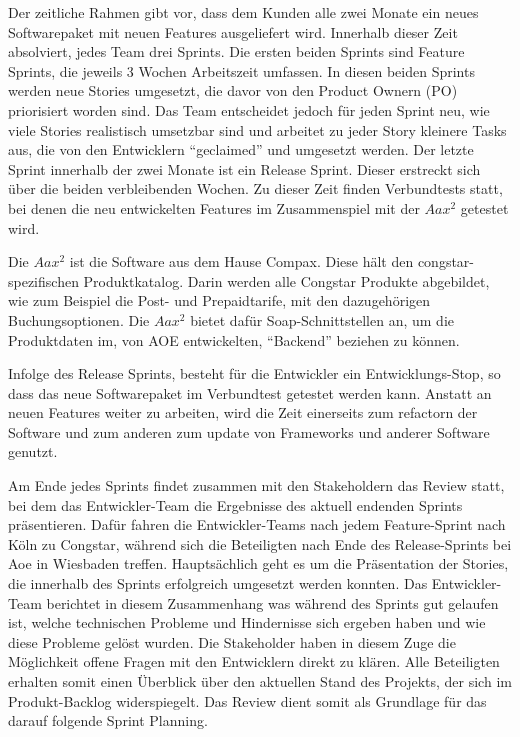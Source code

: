 \documentclass[11pt,a4paper]{article} %
\begin{document}
Der zeitliche Rahmen gibt vor, dass dem Kunden alle zwei Monate ein neues Softwarepaket mit neuen Features ausgeliefert wird. 
Innerhalb dieser Zeit absolviert, jedes Team drei Sprints. Die ersten beiden Sprints sind Feature Sprints, 
die jeweils 3 Wochen Arbeitszeit umfassen. In diesen beiden Sprints werden neue Stories umgesetzt, 
die davor von den Product Ownern (PO) priorisiert worden sind. Das Team entscheidet jedoch für jeden Sprint neu, 
wie viele Stories realistisch umsetzbar sind und arbeitet zu jeder Story kleinere Tasks aus, 
die von den Entwicklern “geclaimed” und umgesetzt werden. Der letzte Sprint innerhalb der zwei Monate ist ein Release Sprint. 
Dieser erstreckt sich über die beiden verbleibenden Wochen. 
Zu dieser Zeit finden Verbundtests statt, bei denen die neu entwickelten Features im Zusammenspiel mit der $Aax^{2}$ getestet wird. 

Die $Aax^{2}$ ist die Software aus dem Hause Compax. Diese hält den congstar-spezifischen Produktkatalog. 
Darin werden alle Congstar Produkte abgebildet, wie zum Beispiel die Post- und Prepaidtarife, mit den dazugehörigen Buchungsoptionen. 
Die $Aax^{2}$ bietet dafür Soap-Schnittstellen an, um die Produktdaten im, von AOE entwickelten, “Backend” beziehen zu können. 

Infolge des Release Sprints, besteht für die Entwickler ein Entwicklungs-Stop, 
so dass das neue Softwarepaket im Verbundtest getestet werden kann. Anstatt an neuen Features weiter zu arbeiten, 
wird die Zeit einerseits zum refactorn der Software und zum anderen zum update von Frameworks und anderer Software genutzt.

Am Ende jedes Sprints findet zusammen mit den Stakeholdern das Review statt, 
bei dem das Entwickler-Team die Ergebnisse des aktuell endenden Sprints präsentieren. 
Dafür fahren die Entwickler-Teams nach jedem Feature-Sprint nach Köln zu Congstar, 
während sich die Beteiligten nach Ende des Release-Sprints bei Aoe in Wiesbaden treffen. 
Hauptsächlich geht es um die Präsentation der Stories, die innerhalb des Sprints erfolgreich umgesetzt werden konnten. 
Das Entwickler-Team berichtet in diesem Zusammenhang was während des Sprints gut gelaufen ist, welche technischen Probleme und 
Hindernisse sich ergeben haben und wie diese Probleme gelöst wurden. Die Stakeholder haben in diesem Zuge 
die Möglichkeit offene Fragen mit den Entwicklern direkt zu klären. Alle Beteiligten erhalten somit 
einen Überblick über den aktuellen Stand des Projekts, der sich im Produkt-Backlog widerspiegelt. 
Das Review dient somit als Grundlage für das darauf folgende Sprint Planning.
\end{document}
